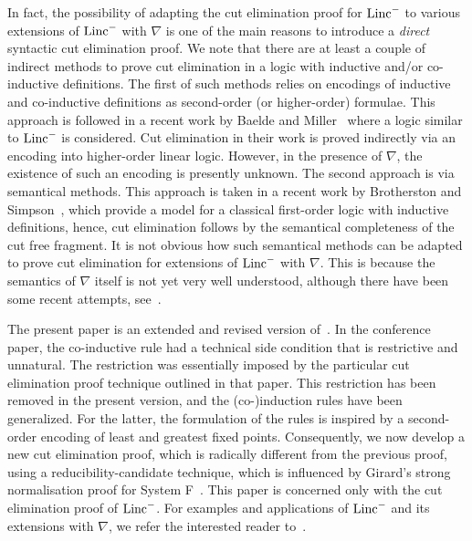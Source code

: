 \documentclass[preprint]{elsarticle}
\newcommand{\Linc}{{\rm Linc}^-}
\begin{document}
In fact, the possibility of adapting the cut elimination proof for
$\Linc$ to various extensions of $\Linc$ with $\nabla$ is one of the
main reasons to introduce a \emph{direct} syntactic cut elimination
proof.  We note that there are at least a couple of indirect methods
to prove cut elimination in a logic with inductive and/or co-inductive
definitions.  The first of such methods relies on encodings of
inductive and co-inductive definitions as second-order (or
higher-order) formulae. This approach is followed in a recent work by
Baelde and Miller~\cite{baelde07lpar} where a  logic similar to $\Linc$
is considered. Cut elimination in their work is proved indirectly via
an encoding into higher-order linear logic. However, in the presence
of $\nabla$, the existence of such an encoding is presently unknown.
The second approach is via semantical methods. This approach is taken
in a recent work by Brotherston and Simpson~\cite{BrotherstonS07},
which provide a model for
a classical first-order logic with inductive definitions, hence, cut
elimination follows  by the semantical completeness of the cut
free fragment.  It is not obvious how such semantical methods can be
adapted to prove cut elimination for extensions of $\Linc$ with
$\nabla$.  This is 
because the semantics of $\nabla$ itself is not yet
very well understood, although there have been some recent attempts,
see~\cite{Miculan05FOSSACS,Schoepp07LFMTP,GabbayFL}.


The present paper is an extended and revised version
of~\cite{Momigliano03TYPES}.  In the conference paper, the co-inductive
rule had a technical side condition that is restrictive and
unnatural. The restriction was essentially imposed by the particular
cut elimination proof technique outlined in that paper.  This
restriction has been removed in the present version, and the
(co-)induction rules have been generalized. For the latter, the
formulation of the rules is inspired by a second-order encoding of
least and greatest fixed points.  Consequently, we now develop a new
cut elimination proof, which is radically different from the previous
proof, using a reducibility-candidate technique, which is influenced
by Girard's strong normalisation proof for System
F~\cite{girard89book}.  This paper is concerned only with the cut
elimination proof of $\Linc$.  For examples and applications of
$\Linc$ and its extensions with $\nabla$, we refer the interested reader
to~\cite{tiu04phd,Bedwyr,gacek08lics,Abella,AbellaSOS,TiuMillerpi}.
\end{document}
